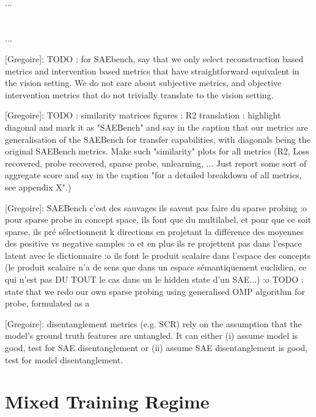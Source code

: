 \documentclass{article}
\newcommand{\greg}[1]{{\color{indigo}[Gregoire]: #1}}
\begin{document}
\paragraph{} ...

\section{\InterVenchA}

\paragraph{} ...

\greg{TODO : for SAEbench, say that we only select reconstruction based metrics and intervention based metrics that have straightforward equivalent in the vision setting. We do not care about subjective metrics, and objective intervention metrics that do not trivially translate to the vision setting.}

\greg{TODO : similarity matrices figures : R2 translation : highlight diagonal and mark it as "SAEBench" and say in the caption that our metrics are generalisation of the SAEBench for transfer capabilities, with diagonals being the original SAEBench metrics. Make such "similarity" plots for all metrics (R2, Loss recovered, probe recovered, sparse probe, unlearning, ... Just report some sort of aggregate score and say in the caption "for a detailed breakdown of all metrics, see appendix X".)}

\greg{SAEBench c'est des sauvages ils savent pas faire du sparse probing :o pour sparse probe in concept space, ils font que du multilabel, et pour que ce soit sparse, ils pré sélectionnent k directions en projetant la différence des moyennes des positive vs negative samples :o et en plus ils re projettent pas dans l'espace latent avec le dictionnaire :o ils font le produit scalaire dans l'espace des concepts (le produit scalaire n'a de sens que dans un espace sémantiquement euclidien, ce qui n'est pas DU TOUT le cas dans un le hidden state d'un SAE...) :o TODO : state that we redo our own sparse probing using generalised OMP algorithm for probe, formulated as a }

\greg{disentanglement metrics (e.g. SCR) rely on the assumption that the model's ground truth features are untangled. It can either (i) assume model is good, test for SAE disentanglement or (ii) assume SAE disentanglement is good, test for model disentanglement.}

\section{Mixed Training Regime}
\end{document}

